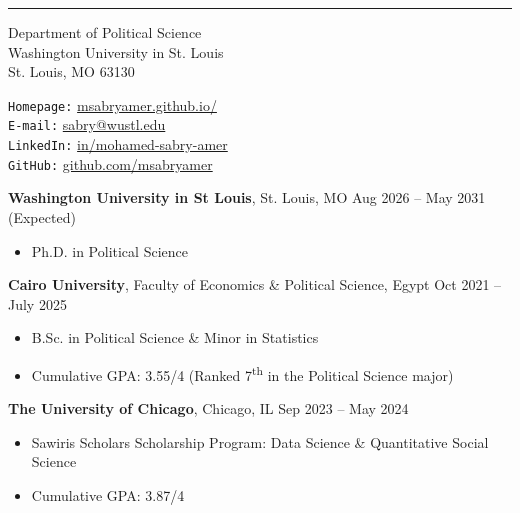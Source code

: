 \documentclass[10pt,a4paper]{article}
\newcommand{\cvsection}[1]{%
  \par\vspace{1.8ex}%
  \noindent\makebox[0pt][r]{\makebox[25mm][l]{\smash{\parbox[t]{24.5mm}{\raggedright\scshape #1}}}}%
  \ignorespaces
}
\newenvironment{cvitems}{%
  \begin{itemize}%
  \setlength{\itemsep}{1pt}%
  \setlength{\parskip}{0pt}%
  \setlength{\parsep}{0pt}%
  \setlength{\topsep}{1.5pt}%
  \setlength{\partopsep}{0pt}%
  \setlength{\leftmargin}{15pt}%
  \setlength{\labelwidth}{8pt}%
  \setlength{\labelsep}{5pt}%
}{%
  \end{itemize}%
}
\begin{document}
\noindent\hspace*{-25mm}
\par\vspace{3pt}
\noindent\hspace*{-25mm}\rule{\dimexpr\textwidth+25mm}{0.4pt}
\par\vspace{5pt}

\cvsection{Contact\\Information}%
\begin{minipage}[t]{75mm}
Department of Political Science\\
Washington University in St. Louis\\
St. Louis, MO 63130
\end{minipage}%
\begin{minipage}[t]{80mm}
\texttt{Homepage:} \href{https://msabryamer.github.io}{msabryamer.github.io/}\\
\texttt{E-mail:\phantom{pe}} \href{mailto:sabry@wustl.edu}{sabry@wustl.edu}\\
\texttt{LinkedIn:\phantom{e}} \href{https://www.linkedin.com/in/mohamed-sabry-amer-128975242/}{in/mohamed-sabry-amer}\\
\texttt{GitHub:\phantom{pei}} \href{https://github.com/msabryamer}{github.com/msabryamer}
\end{minipage}

\cvsection{Education}%
\textbf{Washington University in St Louis}, St. Louis, MO \hfill Aug 2026 -- May 2031 (Expected)
\begin{cvitems}
    \item Ph.D. in Political Science
\end{cvitems}

\vspace{0.7ex}
\textbf{Cairo University}, Faculty of Economics \& Political Science, Egypt \hfill Oct 2021 -- July 2025
\begin{cvitems}
    \item B.Sc. in Political Science \& Minor in Statistics
    \item Cumulative GPA: 3.55/4 (Ranked 7\textsuperscript{th} in the Political Science major)
\end{cvitems}

\vspace{0.7ex}
\textbf{The University of Chicago}, Chicago, IL \hfill Sep 2023 -- May 2024
\begin{cvitems}
    \item Sawiris Scholars Scholarship Program: Data Science \& Quantitative Social Science
    \item Cumulative GPA: 3.87/4
\end{cvitems}
\end{document}
